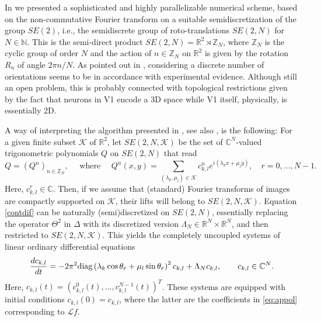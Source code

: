 \documentclass[proc]{edpsmath}
\begin{document}
In \cite{Boscain2012a,Remizov2013,ahe} we presented a sophisticated and highly parallelizable numerical scheme, based on the non-commutative Fourier transform  on a suitable semidiscretization of the group $SE(2)$, i.e., the semidiscrete group of roto-translations $SE(2,N)$ for $N\in\mathbb N$. This is the semi-direct product $SE(2,N) = \mathbb R^2\rtimes \mathbb Z_N$, where $\mathbb Z_N$ is the cyclic group of order $N$ and the action of $n\in\mathbb Z_N$ on $\mathbb R^2$ is given by the rotation $R_{n}$ of angle $2\pi n/N$. As pointed out in \cite{Remizov2013}, considering a discrete number of orientations seems to be in accordance with experimental evidence. Although still an open problem, this is probably connected with topological restrictions given by the fact that neurons in V1 encode a 3D space while V1 itself, physically, is essentially 2D.

A way of interpreting the algorithm presented in \cite{Remizov2013}, see also \cite{visionCDC,gros-papier}, is the following: For a given finite subset $\mathcal K$ of $\mathbb R^2$, let $SE(2,N,\mathcal K)$ be the set of $\mathbb C^N$-valued trigonometric polynomials $Q$ on $SE(2,N)$ that read
\begin{equation}
  \label{eq:appol}
  Q = (Q^n)_{n\in\mathbb Z_N},\quad\text{ where }\quad Q^n(x,y) = \sum_{(\lambda_k,\mu_l)\in \mathcal{K}} c_{k,l}^n e^{i(\lambda_k x+\mu_l y)}, \quad r=0,\ldots,N-1.
\end{equation}
Here, $c^r_{k,l}\in\mathbb C$. Then, if we assume that (standard) Fourier transforms of images are compactly supported on $\mathcal K$, their lifts will belong to $SE(2,N,\mathcal K)$.
Equation \eqref{contdif} can be naturally (semi)discretized on $SE(2,N)$, essentially replacing the operator $\Theta^2$ in $\Delta$ with its discretized version $\Lambda_N\in\mathbb R^N\times \mathbb R^N$, and then restricted to $SE(2,N,\mathcal K)$. This yields the completely uncoupled systems of linear ordinary differential equations
\begin{equation}
  \label{eq:split1}
  \frac{d c_{k,l} }{dt} = - 2\pi^2 \textrm{diag}\left( \lambda_k \cos\theta_r + \mu_l \sin \theta_r \right)^2 c_{k,l} + \Lambda_N c_{k,l}, \qquad c_{k,l}\in\mathbb C^N.\\
\end{equation}
Here, $c_{k,l}(t) = (c_{k,l}^0(t),\ldots,c_{k,l}^{N-1}(t))^T$.
These systems are equipped with initial conditions $c_{k,l}(0) = c_{k,l}$, where the latter are the coefficients in \eqref{eq:appol} corresponding to $\mathcal Lf$.
\end{document}
